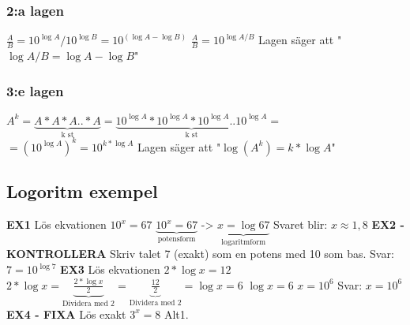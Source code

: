 \documentclass[a4paper,11pt]{article}
\begin{document}
\begin{flushleft}
\subsubsection{2:a lagen}
$\frac{A}{B} = 10^{\log{A}}/10^{\log{B}} = 10^{(\log{A}-\log{B})}$\newline
$\frac{A}{B} = 10^{\log{A/B}} $ \newline
Lagen säger att "$\log{A/B} = \log{A}-\log{B} $"
\subsubsection{3:e lagen}
$A^k = \underbrace{A*A*A..*A}_{\text{k st}} = \underbrace{10^{\log{A}}*10^{\log{A}}*10^{\log{A}}..10^{\log{A}}}_{\text{k st}} = $\newline
$= (10^{\log{A}})^k = 10^{k*\log{A}}$\newline\newline
Lagen säger att "$\log(A^k) = k*\log{A} $"

\subsection{Logoritm exempel}
\textbf{EX1}\newline
Lös ekvationen $ 10^x = 67 $\newline\newline
$ \underbrace{10^x = 67}_{\text{potensform}} $ -> $ \underbrace{x=\log{67}}_{\text{logaritmform}} $\newline
Svaret blir: $ x \approx 1,8 $
\newline\newline
\textbf{EX2 - KONTROLLERA}\newline
Skriv talet 7 (exakt) som en potens med 10 som bas.\newline\newline
Svar: $ 7 = 10^{\log{7}} $
\newline\newline
\textbf{EX3}\newline
Lös ekvationen $ 2*\log{x}=12 $\newline\newline
$ 2*\log{x} = \underbrace{\frac{2*\log{x}}{2}}_{\text{Dividera med 2}} = \underbrace{\frac{12}{2}}_{\text{Dividera med 2}} = \log{x}=6 $ \newline\newline
$ \log{x} = 6 $\newline
$ x = 10^6 $\newline\newline
Svar: $ x = 10^6$
\newline\newline
\textbf{EX4 - FIXA}\newline
Lös exakt $ 3^x = 8 $\newline\newline
Alt1.\newline


\end{flushleft}
\end{document}
